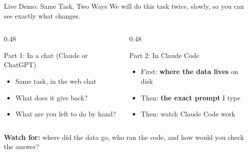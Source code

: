 \documentclass[aspectratio=169, 11pt]{beamer}
\begin{document}
\begin{frame}{Live Demo: Same Task, Two Ways}
  We will do this task twice, slowly, so you can see exactly what changes.

  \vspace{0.6em}
  \begin{columns}[T]
    \begin{column}{0.48\textwidth}
      \begin{block}{Part 1: In a chat (Claude or ChatGPT)}
        \begin{itemize}
          \item Same task, in the web chat
          \item What does it give back?
          \item What are you left to do by hand?
        \end{itemize}
      \end{block}
    \end{column}
    \begin{column}{0.48\textwidth}
      \begin{block}{Part 2: In Claude Code}
        \begin{itemize}
          \item First: \textbf{where the data lives} on disk
          \item Then: \textbf{the exact prompt} I type
          \item Then: watch Claude Code work
        \end{itemize}
      \end{block}
    \end{column}
  \end{columns}

  \vspace{0.8em}
  \textbf{Watch for:} where did the data go, who ran the code, and how would you check the answer?
\end{frame}

\end{document}
